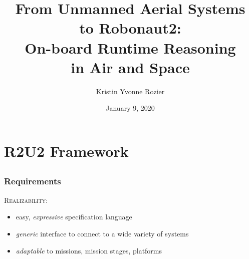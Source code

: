 \documentclass[dvipsnames,svgnames]{beamer}
\title[\textcolor{white}{On-Board Runtime Reasoning}]{From Unmanned Aerial Systems \\ to Robonaut2: \\ On-board Runtime Reasoning \\ in Air and Space}
\author{Kristin Yvonne Rozier}
\date{January 9, 2020}
\begin{document}
\section{R2U2 Framework}
\subsection{ } %



\begin{frame}
\frametitle{Requirements}


\noindent\textsc{\textcolor{RedViolet}{Realizability:}}
\begin{itemize}
\item easy, \emph{\textcolor{RedViolet}{expressive}} specification language %
\item \emph{\textcolor{RedViolet}{generic}} interface to connect to a wide variety of systems
\item \emph{\textcolor{RedViolet}{adaptable}} to missions, mission stages, platforms
\end{itemize}



\end{frame}
\end{document}
